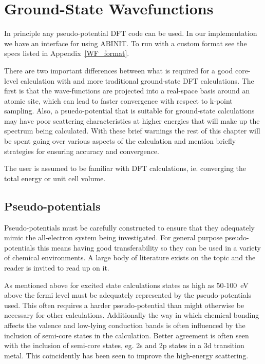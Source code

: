 \documentclass[11pt]{report}
\begin{document}



\chapter{Ground-State Wavefunctions}
In principle any pseudo-potential DFT code can be used. In our implementation we have an interface for using ABINIT\cite{abinit}. To run with a custom format see the specs listed in Appendix~\ref{WF_format}.

There are two important differences between what is required for a good core-level calculation with \OCEAN{} and more traditional ground-state DFT calculations. The first is that the wave-functions are projected into a real-space basis around an atomic site, which can lead to faster convergence with respect to k-point sampling. Also, a psuedo-potential that is suitable for ground-state calculations may have poor scattering characteristics at higher energies that will make up the spectrum being calculated. With these brief warnings the rest of this chapter will be spent going over various aspects of the calculation and mention briefly strategies for ensuring accuracy and convergence.

The user is assumed to be familiar with DFT calculations, ie. converging the total energy or unit cell volume. 

\section{Pseudo-potentials}

Pseudo-potentials must be carefully constructed to ensure that they adequately mimic the all-electron system being investigated. For general purpose pseudo-potentials this means having good transferability so they can be used in a variety of chemical environments. A large body of literature exists on the topic and the reader is invited to read up on it.\cite{Psp}

As mentioned above for excited state calculations states as high as 50-100~eV above the fermi level must be adequately represented by the pseudo-potentials used. This often requires a harder pseudo-potential than might otherwise be necessary for 
other calculations. Additionally the way in which chemical bonding affects the valence and low-lying conduction bands is often influenced by the inclusion of semi-core states in the calculation. Better agreement is often seen with the inclusion of semi-core states, eg. 2s and 2p states in a 3d transition metal. This coincidently has been seen to improve the high-energy scattering. 
\end{document}

